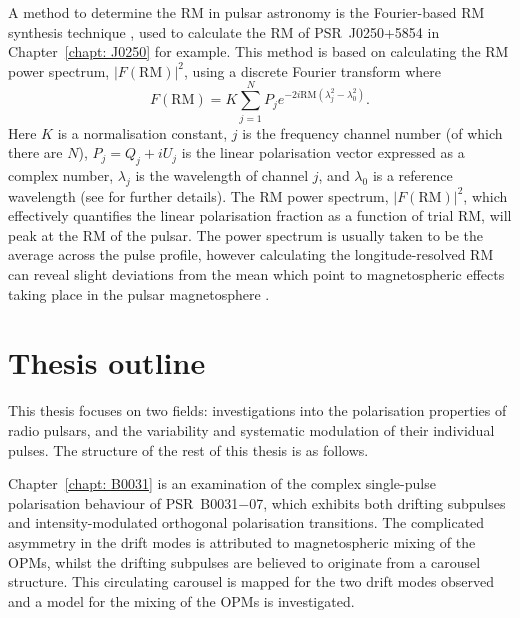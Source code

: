 A method to determine the RM in pulsar astronomy is the Fourier-based RM synthesis technique \citep{Bxxx1966, BBxx2005}, used to calculate the RM of PSR~J0250+5854 in Chapter~\ref{chapt: J0250} for example.
This method is based on calculating the RM power spectrum, $|F(\mathrm{RM})|^2$, using a discrete Fourier transform where 
\begin{equation}
    F(\mathrm{RM}) = K \sum_{j=1}^N P_j e^{-2i \mathrm{RM} (\lambda^2_j - \lambda^2_0)}.
\end{equation}
Here $K$ is a normalisation constant, $j$ is the frequency channel number (of which there are $N$), $P_j = Q_j + iU_j$ is the linear polarisation vector expressed as a complex number, $\lambda_j$ is the wavelength of channel $j$, and $\lambda_0$ is a reference wavelength (see \citealt{Hxxx2008} for further details). The RM power spectrum, $|F(\mathrm{RM})|^2$, which effectively quantifies the linear polarisation fraction as a function of trial RM, will peak at the RM of the pulsar. The power spectrum is usually taken to be the average across the pulse profile, however calculating the longitude-resolved RM can reveal slight deviations from the mean which point to magnetospheric effects taking place in the pulsar magnetosphere \citep{IJWx2019}.




















\section{Thesis outline}
\label{sec: intro - thesis outline}

This thesis focuses on two fields: investigations into the polarisation properties of radio pulsars, and the variability and systematic modulation of their individual pulses. The structure of the rest of this thesis is as follows.

Chapter~\ref{chapt: B0031} is an examination of the complex single-pulse polarisation behaviour of PSR~B0031$-$07, which exhibits both drifting subpulses and intensity-modulated orthogonal polarisation transitions. The complicated asymmetry in the drift modes is attributed to magnetospheric mixing of the OPMs, whilst the drifting subpulses are believed to originate from a carousel structure. This circulating carousel is mapped for the two drift modes observed and a model for the mixing of the OPMs is investigated.

